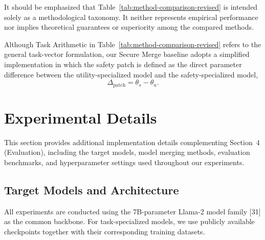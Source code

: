 \documentclass{article}
\begin{document}
It should be emphasized that Table~\ref{tab:method-comparison-revised} is intended solely as a methodological taxonomy. It neither represents empirical performance nor implies theoretical guarantees or superiority among the compared methods.

Although Task Arithmetic in Table~\ref{tab:method-comparison-revised} refers to the general task-vector formulation, our Secure Merge baseline adopts a simplified implementation in which the safety patch is defined as the direct parameter difference between the utility-specialized model and the safety-specialized model,
\[
\Delta_{\mathrm{patch}}=\theta_s-\theta_u.
\]




\section{Experimental Details}
\label{app:実験設計の詳細}

This section provides additional implementation details complementing Section~4 (Evaluation), including the target models, model merging methods, evaluation benchmarks, and hyperparameter settings used throughout our experiments.

\subsection{Target Models and Architecture}

All experiments are conducted using the 7B-parameter Llama-2 model family [31] as the common backbone. For task-specialized models, we use publicly available checkpoints together with their corresponding training datasets.
\end{document}
